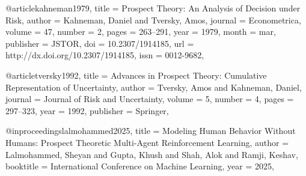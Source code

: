 
@article{kahneman1979,
  title     = {Prospect Theory: An Analysis of Decision under Risk},
  author    = {Kahneman, Daniel and Tversky, Amos},
  journal   = {Econometrica},
  volume    = {47},
  number    = {2},
  pages     = {263--291},
  year      = {1979},
  month     = mar,
  publisher = {JSTOR},
  doi       = {10.2307/1914185},
  url       = {http://dx.doi.org/10.2307/1914185},
  issn      = {0012-9682},
}

@article{tversky1992,
  title     = {Advances in Prospect Theory: Cumulative Representation of Uncertainty},
  author    = {Tversky, Amos and Kahneman, Daniel},
  journal   = {Journal of Risk and Uncertainty},
  volume    = {5},
  number    = {4},
  pages     = {297--323},
  year      = {1992},
  publisher = {Springer},
}

@inproceedings{lalmohammed2025,
  title     = {Modeling Human Behavior Without Humans: Prospect Theoretic Multi-Agent Reinforcement Learning},
  author    = {Lalmohammed, Sheyan and Gupta, Khush and Shah, Alok and Ramji, Keshav},
  booktitle = {International Conference on Machine Learning},
  year      = {2025},
}

